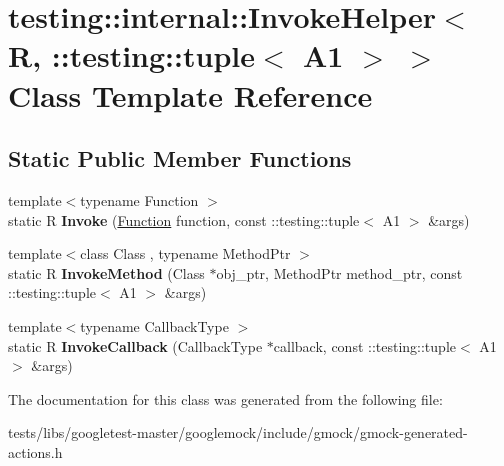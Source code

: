 \hypertarget{classtesting_1_1internal_1_1InvokeHelper_3_01R_00_01_1_1testing_1_1tuple_3_01A1_01_4_01_4}{}\section{testing\+:\+:internal\+:\+:Invoke\+Helper$<$ R, \+:\+:testing\+:\+:tuple$<$ A1 $>$ $>$ Class Template Reference}
\label{classtesting_1_1internal_1_1InvokeHelper_3_01R_00_01_1_1testing_1_1tuple_3_01A1_01_4_01_4}
\subsection*{Static Public Member Functions}
\begin{DoxyCompactItemize}
\item 
\mbox{\label{classtesting_1_1internal_1_1InvokeHelper_3_01R_00_01_1_1testing_1_1tuple_3_01A1_01_4_01_4_a162b9783d4904f5f45d4e677299cab0d}} 
{\footnotesize template$<$typename Function $>$ }\\static R {\bfseries Invoke} (\hyperlink{structtesting_1_1internal_1_1Function}{Function} function, const \+::testing\+::tuple$<$ A1 $>$ \&args)
\item 
\mbox{\label{classtesting_1_1internal_1_1InvokeHelper_3_01R_00_01_1_1testing_1_1tuple_3_01A1_01_4_01_4_a320389ba7ab6458aeb70c07a2c9e061b}} 
{\footnotesize template$<$class Class , typename Method\+Ptr $>$ }\\static R {\bfseries Invoke\+Method} (Class $\ast$obj\+\_\+ptr, Method\+Ptr method\+\_\+ptr, const \+::testing\+::tuple$<$ A1 $>$ \&args)
\item 
\mbox{\label{classtesting_1_1internal_1_1InvokeHelper_3_01R_00_01_1_1testing_1_1tuple_3_01A1_01_4_01_4_a15660d8fb6fe6ec6b2e030fed772548e}} 
{\footnotesize template$<$typename Callback\+Type $>$ }\\static R {\bfseries Invoke\+Callback} (Callback\+Type $\ast$callback, const \+::testing\+::tuple$<$ A1 $>$ \&args)
\end{DoxyCompactItemize}


The documentation for this class was generated from the following file\+:\begin{DoxyCompactItemize}
\item 
tests/libs/googletest-\/master/googlemock/include/gmock/gmock-\/generated-\/actions.\+h\end{DoxyCompactItemize}

